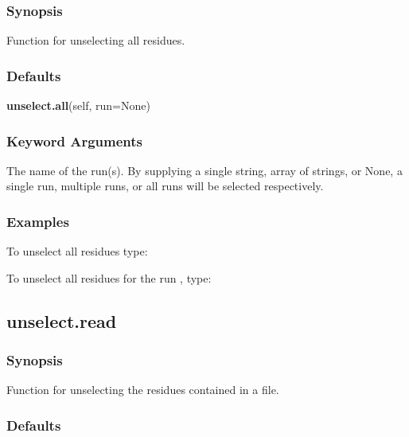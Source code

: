 \subsubsection{Synopsis}

Function for unselecting all residues.

\subsubsection{Defaults}

\textsf{\textbf{unselect.all}(self, run=None)}


\subsubsection{Keyword Arguments}


  The name of the run(s).  By supplying a single string, array of strings, or None, a single run, multiple runs, or all runs will be selected respectively.

\subsubsection{Examples}

To unselect all residues type:




To unselect all residues for the run 
, type:





\newpage

\subsection{unselect.read}


\subsubsection{Synopsis}

Function for unselecting the residues contained in a file.

\subsubsection{Defaults}


